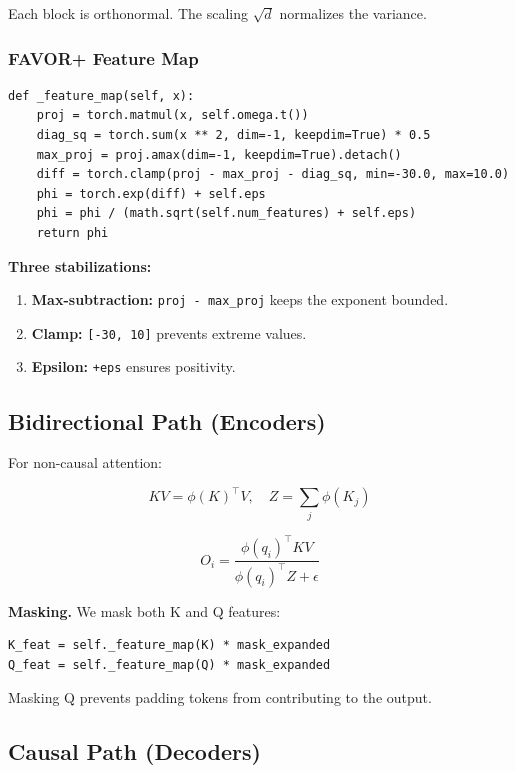 Each block is orthonormal. The scaling $\sqrt{d}$ normalizes the variance.

\subsubsection{FAVOR+ Feature Map}

\begin{lstlisting}
def _feature_map(self, x):
    proj = torch.matmul(x, self.omega.t())
    diag_sq = torch.sum(x ** 2, dim=-1, keepdim=True) * 0.5
    max_proj = proj.amax(dim=-1, keepdim=True).detach()
    diff = torch.clamp(proj - max_proj - diag_sq, min=-30.0, max=10.0)
    phi = torch.exp(diff) + self.eps
    phi = phi / (math.sqrt(self.num_features) + self.eps)
    return phi
\end{lstlisting}

\textbf{Three stabilizations:}
\begin{enumerate}
\item \textbf{Max-subtraction:} \texttt{proj - max\_proj} keeps the exponent bounded.
\item \textbf{Clamp:} \texttt{[-30, 10]} prevents extreme values.
\item \textbf{Epsilon:} \texttt{+eps} ensures positivity.

\end{enumerate}
\subsection{Bidirectional Path (Encoders)}

For non-causal attention:

\[
KV = \phi(K)^\top V, \quad Z = \sum_j \phi(K_j)
\tag{4.1}
\]

\[
O_i = \frac{\phi(q_i)^\top KV}{\phi(q_i)^\top Z + \epsilon}
\tag{4.2}
\]

\textbf{Masking.} We mask both K and Q features:

\begin{lstlisting}
K_feat = self._feature_map(K) * mask_expanded
Q_feat = self._feature_map(Q) * mask_expanded
\end{lstlisting}

Masking Q prevents padding tokens from contributing to the output.

\subsection{Causal Path (Decoders)}

